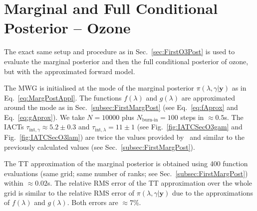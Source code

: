 \section{Marginal and Full Conditional Posterior -- Ozone}
The exact same setup and procedure as in Sec.~\ref{sec:FirstO3Post} is used to evaluate the marginal posterior and then the full conditional posterior of ozone, but with the approximated forward model.

The MWG is initialised at the mode of the marginal posterior $\pi(\lambda,\gamma| \bm{y})$ as in Eq.~\ref{eq:MargPostAppl}.
The functions $f(\lambda)$ and $g(\lambda)$ are approximated around the mode as in Sec.~\ref{subsec:FirstMargPost} (see Eq.~\ref{eq:fAprox} and Eq.~\ref{eq:gAprox}).
We take $N = 10000$ plus $N_{\text{burn-in}} = 100$ steps in $\approx 0.5$s.
The IACTs $\tau_{\text{int}, \gamma} \approx 5.2 \pm 0.3$ and $\tau_{\text{int}, \lambda} = 11 \pm 1 $ (see Fig.~\ref{fig:IATCSecO3gam} and Fig.~\ref{fig:IATCSecO3lam}) are twice the values provided by~\cite{drikHesse} and similar to the previously calculated values (see Sec.~\ref{subsec:FirstMargPost}).

The TT approximation of the marginal posterior is obtained using 400 function evaluations (same grid; same number of ranks; see Sec.~\ref{subsec:FirstMargPost}) within $\approx 0.02$s.
The relative RMS error of the TT approximation over the whole grid is similar to the relative RMS error of $\pi(\lambda,\gamma| \bm{y})$ due to the approximations of $f(\lambda)$ and $g(\lambda)$.
Both errors are $\approx 7\%$.

